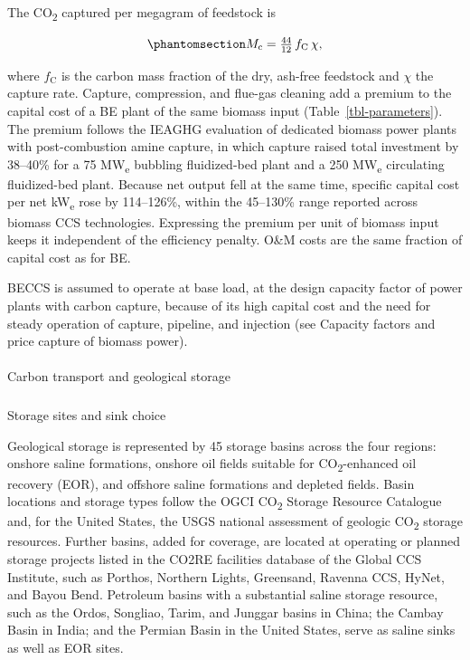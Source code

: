 \documentclass[
  letterpaper,
  twoside,
  twocolumn,
  9pt]{article}
\makeatletter
\let\oldparagraph\paragraph
\renewcommand{\paragraph}{
    \@ifstar
      \xxxParagraphStar
      \xxxParagraphNoStar
  }
\newcommand{\xxxParagraphStar}[1]{\oldparagraph*{#1}\mbox{}}
\newcommand{\xxxParagraphNoStar}[1]{\oldparagraph{#1}\mbox{}}
\let\oldsubparagraph\subparagraph
\renewcommand{\subparagraph}{
    \@ifstar
      \xxxSubParagraphStar
      \xxxSubParagraphNoStar
  }
\newcommand{\xxxSubParagraphStar}[1]{\oldsubparagraph*{#1}\mbox{}}
\newcommand{\xxxSubParagraphNoStar}[1]{\oldsubparagraph{#1}\mbox{}}
\makeatother
\begin{document}
The CO\textsubscript{2} captured per megagram of feedstock is

\begin{equation}\phantomsection\label{eq-capture}{M_{\mathrm{c}} = \tfrac{44}{12}\, f_{\mathrm{C}}\, \chi,}\end{equation}

where \(f_{\mathrm{C}}\) is the carbon mass fraction of the dry,
ash-free feedstock \citep{phyllis2} and \(\chi\) the capture rate.
Capture, compression, and flue-gas cleaning add a premium to the capital
cost of a BE plant of the same biomass input
(Table~\ref{tbl-parameters}). The premium follows the IEAGHG evaluation
of dedicated biomass power plants with post-combustion amine capture, in
which capture raised total investment by 38--40\% for a 75
MW\textsubscript{e} bubbling fluidized-bed plant and a 250
MW\textsubscript{e} circulating fluidized-bed plant.\citep{ieaghg2009}
Because net output fell at the same time, specific capital cost per net
kW\textsubscript{e} rose by 114--126\%, within the 45--130\% range
reported across biomass CCS technologies.\citep{bhave2017} Expressing
the premium per unit of biomass input keeps it independent of the
efficiency penalty. O\&M costs are the same fraction of capital cost as
for BE.

BECCS is assumed to operate at base load, at the design capacity factor
of power plants with carbon capture,\citep{petranova2020} because of its
high capital cost and the need for steady operation of capture,
pipeline, and injection \citep{johansson2019, prado2023} (see Capacity
factors and price capture of biomass power).

\paragraph{Carbon transport and geological
storage}\label{carbon-transport-and-geological-storage}

\subparagraph{Storage sites and sink
choice}\label{storage-sites-and-sink-choice}

Geological storage is represented by 45 storage basins across the four
regions: onshore saline formations, onshore oil fields suitable for
CO\textsubscript{2}-enhanced oil recovery (EOR), and offshore saline
formations and depleted fields. Basin locations and storage types follow
the OGCI CO\textsubscript{2} Storage Resource Catalogue
\citep{ogci2024csrc} and, for the United States, the USGS national
assessment of geologic CO\textsubscript{2} storage
resources.\citep{usgs2013co2} Further basins, added for coverage, are
located at operating or planned storage projects listed in the CO2RE
facilities database of the Global CCS Institute,\citep{gccsi2025co2re}
such as Porthos, Northern Lights, Greensand, Ravenna CCS, HyNet, and
Bayou Bend. Petroleum basins with a substantial saline storage resource,
such as the Ordos, Songliao, Tarim, and Junggar basins in China; the
Cambay Basin in India; and the Permian Basin in the United States, serve
as saline sinks as well as EOR sites.
\end{document}

